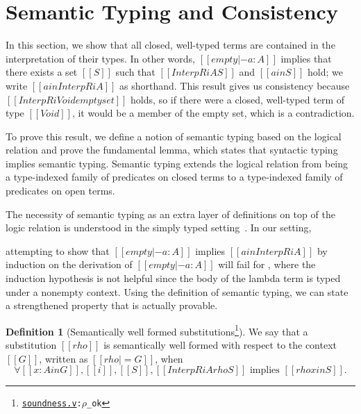 \documentclass[\ifpublic nolinenum\else\fi,online,OA]{jfp}
\newcommand{\scw}[1]{}
\newcommand{\jc}[1]{}
\newcommand{\dotv}[2]{\href{#1}{\texttt{#1}}{\texttt{:#2}}}
\theoremstyle{definition}
\newtheorem{definition}[theorem]{Definition}
\begin{document}
\section{Semantic Typing and Consistency}
\label{sec:logrelproof}

\scw{Would it make sense to define the notation $a \in [\![A]\!]^i$ when
there exists some $S$ such that $[[InterpR i A S]]$ and $[[a in S]]$ ?}
\jc{I like this notation too, $[[a in InterpR i A]]$}

In this section, we show that all closed, well-typed terms are contained
in the interpretation of their types. In other words, $[[empty |- a : A]]$
implies that there exists a set $[[S]]$ such that $[[InterpR i A S]]$ and
$[[a in S]]$ hold; we write $[[a in InterpR i A]]$ as shorthand. This result
gives us consistency because $[[InterpR i Void emptyset]]$ holds, so if there
were a closed, well-typed term of type $[[Void]]$, it would be a member of the
empty set, which is a contradiction.

To prove this result, we define a notion of semantic typing based on the
logical relation and prove the fundamental lemma, which states that syntactic
typing implies semantic typing. Semantic typing extends the logical relation
from being a type-indexed family of predicates on closed terms to a
type-indexed family of predicates on open terms.

The necessity of semantic typing as an extra layer of definitions on top of the
logic relation is understood in the simply typed 
setting~\citep{skorstengaard2019introduction, harpertait,pierce2002types}.
In our setting,
\jc{Is this trying to say that our setting is different from the simply typed setting,
or the same as the simply typed setting? Are the definitions to follow on semantic typing
taken from the works cited above, or are they our own modifications?}  
attempting to show that $[[empty |- a : A]]$ implies $[[a in InterpR i A]]$ by
induction on the derivation of $[[empty |- a : A]]$ will fail for ,
where the induction hypothesis is not helpful since the body of the lambda term
is typed under a nonempty context. Using the definition of semantic typing, we
can state a strengthened property that is actually provable.

\begin{definition}[Semantically well formed substitutions\footnote{\dotv{soundness.v}{$\rho$\_ok}}]
  We say that a substitution $[[rho]]$ is semantically well formed with respect
  to the context $[[G]]$, written as $[[rho |= G]]$, when
  \[ \forall [[x : A in G]], [[i]], [[S]],
  [[InterpR i A { rho } S ]] \text{ implies } [[rho x in S]]. \]
\end{definition}
\end{document}
